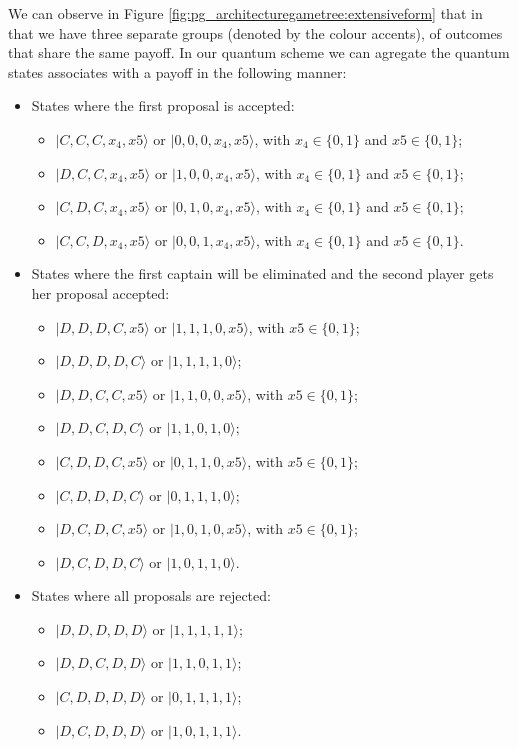 We can observe in Figure \ref{fig:pg_architecturegametree:extensiveform} that in that we have three separate groups (denoted by the colour accents), of outcomes that share the same payoff. In our quantum scheme we can agregate the quantum states associates with a payoff in the following manner: 
\begin{itemize}
\item States where the first proposal is accepted:
\begin{itemize}
\item $\vert C,C,C,x_{4},x{5}\rangle$ or $\vert0,0,0,x_{4},x{5}\rangle$, with $x_{4} \in\{0,1\}$ and $x{5} \in \{0,1\}$;
\item $\vert D,C,C,x_{4},x{5}\rangle$ or $\vert1,0,0,x_{4},x{5}\rangle$, with $x_{4} \in\{0,1\}$ and $x{5} \in \{0,1\}$;
\item $\vert C,D,C,x_{4},x{5}\rangle$ or $\vert0,1,0,x_{4},x{5}\rangle$, with $x_{4} \in\{0,1\}$ and $x{5} \in \{0,1\}$;
\item $\vert C,C,D,x_{4},x{5}\rangle$ or $\vert0,0,1,x_{4},x{5}\rangle$, with $x_{4} \in\{0,1\}$ and $x{5} \in \{0,1\}$.
\end{itemize}
\item States where the first captain will be eliminated and the second player gets her proposal accepted:
\begin{itemize}
\item $\vert D,D,D,C,x{5}\rangle$ or $\vert1,1,1,0,x{5}\rangle$, with $x{5} \in \{0,1\}$;
\item $\vert D,D,D,D,C\rangle$ or $\vert1,1,1,1,0\rangle$;
\item $\vert D,D,C,C,x{5}\rangle$ or $\vert1,1,0,0,x{5}\rangle$, with $x{5} \in \{0,1\}$;
\item $\vert D,D,C,D,C\rangle$ or $\vert1,1,0,1,0\rangle$;
\item $\vert C,D,D,C,x{5}\rangle$ or $\vert0,1,1,0,x{5}\rangle$, with $x{5} \in \{0,1\}$;
\item $\vert C,D,D,D,C\rangle$ or $\vert0,1,1,1,0\rangle$;
\item $\vert D,C,D,C,x{5}\rangle$ or $\vert1,0,1,0,x{5}\rangle$, with $x{5} \in \{0,1\}$;
\item $\vert D,C,D,D,C\rangle$ or $\vert1,0,1,1,0\rangle$.
\end{itemize}
\item States where all proposals are rejected:
\begin{itemize}
\item $\vert D,D,D,D,D\rangle$ or $\vert1,1,1,1,1\rangle$;
\item $\vert D,D,C,D,D\rangle$ or $\vert1,1,0,1,1\rangle$;
\item $\vert C,D,D,D,D\rangle$ or $\vert0,1,1,1,1\rangle$;
\item $\vert D,C,D,D,D\rangle$ or $\vert1,0,1,1,1\rangle$.
\end{itemize}
\end{itemize}

